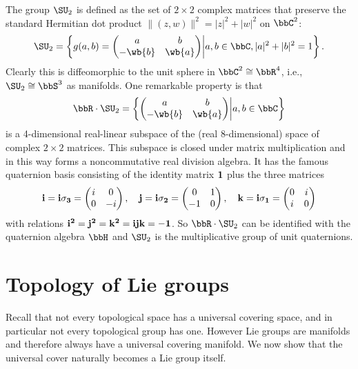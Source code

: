 \begin{example}
    The group $\SU_2$ is defined as the set of $2\times2$ complex matrices that preserve the standard Hermitian dot product $\lVert(z,w)\rVert^2=|z|^2+|w|^2$ on $\bbC^2$:
    \[\SU_2=\left\{g(a,b)=
    \begin{pmatrix}
        a&b\\-\wb{b}&\wb{a}
    \end{pmatrix}
    \middle| a,b\in\bbC, |a|^2+|b|^2=1
    \right\}.\]
    Clearly this is diffeomorphic to the unit sphere in $\bbC^2\cong \bbR^4$, i.e., $\SU_2\cong \bbS^3$ as manifolds. One remarkable property is that 
    \[\bbR\cdot \SU_2=\left\{
    \begin{pmatrix}
        a&b\\-\wb{b}&\wb{a}
    \end{pmatrix}
    \middle| a,b\in\bbC
    \right\}\]
    is a 4-dimensional real-linear subspace of the (real 8-dimensional) space of complex $2\times 2$ matrices. This subspace is closed under matrix multiplication and in this way forms a noncommutative real division algebra. It has the famous quaternion basis consisting of the identity matrix $\bf{1}$ plus the three matrices
    \[\bf{i}=i\sigma_3=\begin{pmatrix}
        i&0\\0&-i
    \end{pmatrix},\quad 
    \bf{j}=i\sigma_2=\begin{pmatrix}
        0&1\\-1&0
    \end{pmatrix},\quad
    \bf{k}=i\sigma_1=\begin{pmatrix}
        0&i\\i&0
    \end{pmatrix}\]
    with relations $\bf{i}^2=\bf{j}^2=\bf{k}^2=\bf{ijk}=-\bf{1}$. So $\bbR\cdot\SU_2$ can be identified with the quaternion algebra $\bbH$ and $\SU_2$ is the multiplicative group of unit quaternions.
\end{example}










\section{Topology of Lie groups}

Recall that not every topological space has a universal covering space, and in particular not every topological group has one. However Lie groups are manifolds and therefore always have a universal covering manifold. We now show that the universal cover naturally becomes a Lie group itself.


